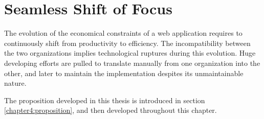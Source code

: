 \chapter{Seamless Shift of Focus} \label{chapter4}
\minitoc
\eject

The evolution of the economical constraints of a web application requires to continuously shift from productivity to efficiency.
The incompatibility between the two organizations implies technological ruptures during this evolution.
Huge developing efforts are pulled to translate manually from one organization into the other, and later to maintain the implementation despites its unmaintainable nature.

The proposition developed in this thesis is introduced in section \ref{chapter4:proposition}, and then developed throughout this chapter.






% 